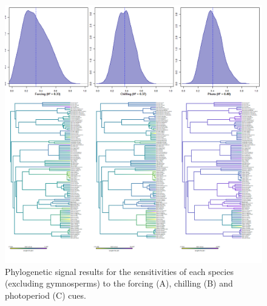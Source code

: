 \documentclass{article}\usepackage[]{graphicx}\usepackage[]{color}
\begin{document}
\begin{figure} [H]
  \begin{center}
  \includegraphics[width=14cm]{..//..//analyses/phylogeny/figures/Sensitivities_phylosig_spslev_angiosperms.png}
  \caption{Phylogenetic signal results for the sensitivities of each species (excluding gymnosperms) to the forcing (A), chilling (B) and photoperiod (C) cues.}
  \label{fig:phylosig_angiosperm}
  \end{center}
\end{figure}
\end{document}

